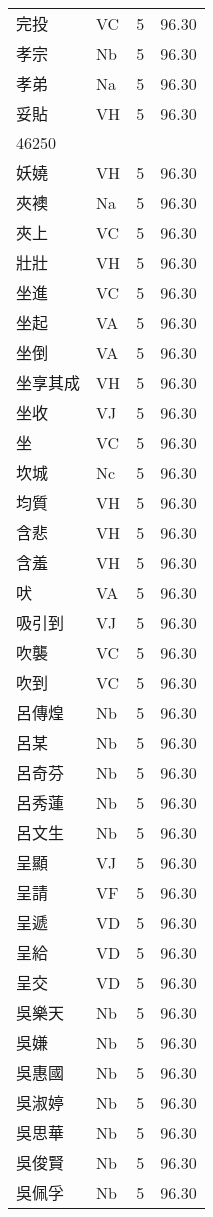 \documentclass[twocolumn]{book}
\begin{document}
\begin{supertabular}{llrr}
完投 & VC & 5 &  96.30\\
孝宗 & Nb & 5 &  96.30\\
孝弟 & Na & 5 &  96.30\\
妥貼 & VH & 5 &  96.30\\
46250\\
妖嬈 & VH & 5 &  96.30\\
夾襖 & Na & 5 &  96.30\\
夾上 & VC & 5 &  96.30\\
壯壯 & VH & 5 &  96.30\\
坐進 & VC & 5 &  96.30\\
坐起 & VA & 5 &  96.30\\
坐倒 & VA & 5 &  96.30\\
坐享其成 & VH & 5 &  96.30\\
坐收 & VJ & 5 &  96.30\\
坐 & VC & 5 &  96.30\\
坎城 & Nc & 5 &  96.30\\
均質 & VH & 5 &  96.30\\
含悲 & VH & 5 &  96.30\\
含羞 & VH & 5 &  96.30\\
吠 & VA & 5 &  96.30\\
吸引到 & VJ & 5 &  96.30\\
吹襲 & VC & 5 &  96.30\\
吹到 & VC & 5 &  96.30\\
呂傳煌 & Nb & 5 &  96.30\\
呂某 & Nb & 5 &  96.30\\
呂奇芬 & Nb & 5 &  96.30\\
呂秀蓮 & Nb & 5 &  96.30\\
呂文生 & Nb & 5 &  96.30\\
呈顯 & VJ & 5 &  96.30\\
呈請 & VF & 5 &  96.30\\
呈遞 & VD & 5 &  96.30\\
呈給 & VD & 5 &  96.30\\
呈交 & VD & 5 &  96.30\\
吳樂天 & Nb & 5 &  96.30\\
吳嫌 & Nb & 5 &  96.30\\
吳惠國 & Nb & 5 &  96.30\\
吳淑婷 & Nb & 5 &  96.30\\
吳思華 & Nb & 5 &  96.30\\
吳俊賢 & Nb & 5 &  96.30\\
吳佩孚 & Nb & 5 &  96.30\\

\end{supertabular}
\end{document}
